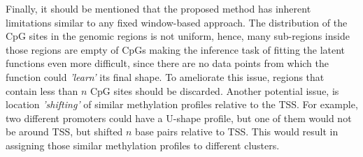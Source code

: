 Finally, it should be mentioned that the proposed method has inherent limitations similar to any fixed window-based approach. The distribution of the CpG sites in the genomic regions is not uniform, hence, many sub-regions inside those regions are empty of CpGs making the inference task of fitting the latent functions even more difficult, since there are no data points from which the function could \emph{'learn'} its final shape. To ameliorate this issue, regions that contain less than $n$ CpG sites should be discarded. Another potential issue, is location \emph{'shifting'} of similar methylation profiles relative to the TSS. For example, two different promoters could have a U-shape profile, but one of them would not be around TSS, but shifted $n$ base pairs relative to TSS. This would result in assigning those similar methylation profiles to different clusters. 
